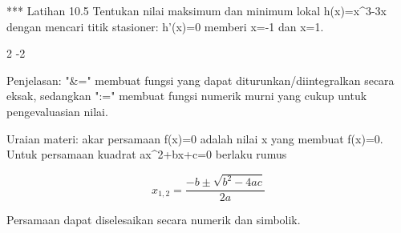 \documentclass[a4paper,10pt]{article}
\begin{document}
\begin{eulernotebook}
\begin{eulercomment}
\begin{eulercomment}
\begin{eulercomment}
\begin{eulercomment}
\begin{eulercomment}
\begin{eulercomment}
\begin{eulercomment}
*** Latihan 10.5
Tentukan nilai maksimum dan minimum lokal h(x)=x\textasciicircum{}3-3x dengan mencari titik
stasioner: h'(x)=0 memberi x=-1 dan x=1.
\end{eulercomment}
\begin{euleroutput}
  2
  -2
\end{euleroutput}
\begin{eulercomment}
Penjelasan: "\&=" membuat fungsi yang dapat diturunkan/diintegralkan secara
eksak, sedangkan ":=" membuat fungsi numerik murni yang cukup untuk
pengevaluasian nilai.

\begin{eulercomment}
\begin{eulercomment}
Uraian materi: akar persamaan f(x)=0 adalah nilai x yang membuat f(x)=0.
Untuk persamaan kuadrat ax\textasciicircum{}2+bx+c=0 berlaku rumus

\end{eulercomment}
\begin{eulerformula}
\[
x_{1,2}=\frac{-b\pm\sqrt{b^2-4ac}}{2a}
\]
\end{eulerformula}
\begin{eulercomment}
Persamaan dapat diselesaikan secara numerik dan simbolik.


\end{eulercomment}
\end{eulercomment}
\end{eulercomment}
\end{eulercomment}
\end{eulercomment}
\end{eulercomment}
\end{eulercomment}
\end{eulercomment}
\end{eulercomment}
\end{eulernotebook}
\end{document}
